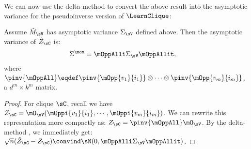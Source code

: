 
We can now use the delta-method to convert the above result into 
the asymptotic variance for the pseudoinverse version of $\LearnClique$:
\begin{lemma}
  \label{lem:mom-variance}  
  Assume $\hat M_{\sV}$ has asymptotic variance $\Sigma_\sV$ defined above.
  Then the asymptotic variance of $\hat Z_\sC$ is:
  \begin{align*}
    \Sigma^{\mom} &= \mOppAlli \Sigma_\sV \mOppAllit,
  \end{align*}
  where $\pinv{\mOppAll} \eqdef \pinv{\mOpp{v_1}{i_1}} \otimes
  \cdots \otimes \pinv{\mOpp{v_m}{i_m}}$, a $d^m \times k^m$ matrix.
\end{lemma}
\begin{proof}
For clique $\sC$, recall we have
  $Z_{\sC} = \mO_\sV(\mOppi{v_1}{i_1},\cdots,\mOppi{v_m}{i_m})$.
We can rewrite this representation more compactly as: $Z_{\sC} = \pinv{\mOppAll} \mO_\sV$.
By the delta-method \cite{vaart98asymptotic},
we immediately get:
$\sqrt{n}(\hat Z_\sC - Z_\sC) \convind \sN(0, \mOppAlli \Sigma_\sV \mOppAllit)$.
\end{proof}

